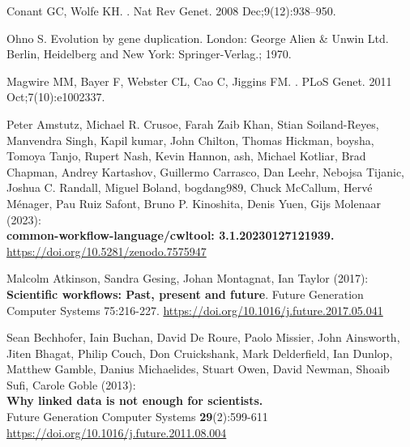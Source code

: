 \documentclass[10pt,letterpaper]{article}
\begin{document}
%
%
% 
\begin{thebibliography}{10}

Conant GC, Wolfe KH.
.
\newblock Nat Rev Genet. 2008 Dec;9(12):938--950.

Ohno S.
\newblock Evolution by gene duplication.
\newblock London: George Alien \& Unwin Ltd. Berlin, Heidelberg and New York:
  Springer-Verlag.; 1970.

Magwire MM, Bayer F, Webster CL, Cao C, Jiggins FM.
.
\newblock PLoS Genet. 2011 Oct;7(10):e1002337.





 Peter Amstutz, Michael R. Crusoe, Farah Zaib Khan,
Stian Soiland-Reyes, Manvendra Singh, Kapil kumar, John Chilton, Thomas
Hickman, boysha, Tomoya Tanjo, Rupert Nash, Kevin Hannon, ash, Michael
Kotliar, Brad Chapman, Andrey Kartashov, Guillermo Carrasco, Dan Leehr,
Nebojsa Tijanic, Joshua C. Randall, Miguel Boland, bogdang989, Chuck
McCallum, Hervé Ménager, Pau Ruiz Safont, Bruno P. Kinoshita, Denis
Yuen, Gijs Molenaar (2023):\\
\textbf{common-workflow-language/cwltool: 3.1.20230127121939.}\\
\url{https://doi.org/10.5281/zenodo.7575947}

 Malcolm Atkinson, Sandra Gesing, Johan Montagnat,
Ian Taylor (2017): \textbf{Scientific workflows: Past, present and
future}. Future Generation Computer Systems 75:216-227.
\url{https://doi.org/10.1016/j.future.2017.05.041}

 Sean Bechhofer, Iain Buchan, David De Roure, Paolo
Missier, John Ainsworth, Jiten Bhagat, Philip Couch, Don Cruickshank,
Mark Delderfield, Ian Dunlop, Matthew Gamble, Danius Michaelides, Stuart
Owen, David Newman, Shoaib Sufi, Carole Goble (2013):\\
\textbf{Why linked data is not enough for scientists.}\\
Future Generation Computer Systems \textbf{29}(2):599-611\\
\url{https://doi.org/10.1016/j.future.2011.08.004}


\end{thebibliography}
\end{document}
